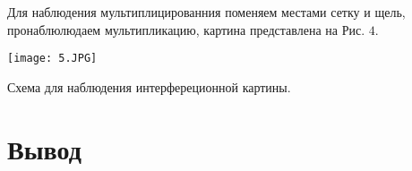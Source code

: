 \documentclass{article}
\begin{document}
 \begin{minipage}{0.47\textwidth}
\begin{center}
 Для наблюдения мультиплицированния поменяем местами сетку и щель, пронаблюлюдаем мультипликацию, картина представлена на Рис. $4 .$

\end{center}
\end{minipage}
\begin{minipage}{0.47\textwidth}
\begin{center}

\texttt{[image: 5.JPG]}
\end{center}

\begin{center}
Схема для наблюдения интерфереционной картины.

\end{center}
\end{minipage}


\section{Вывод}
\end{document}
